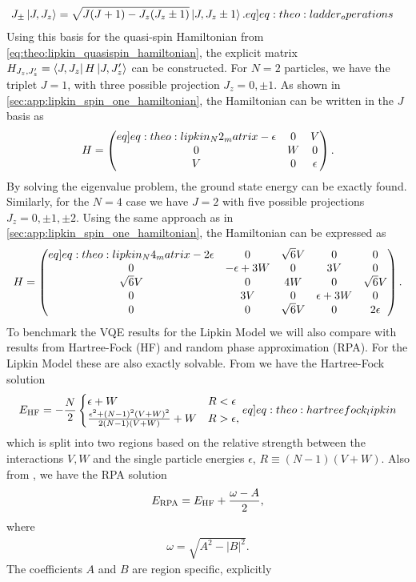 \begin{align}
    J_\pm \ket{J,J_z} &= \sqrt{J(J+1)-J_z (J_z \pm 1)} \ket{J,J_z \pm 1}. \label[eq]{eq:theo:ladder_operations}
\end{align}
Using this basis for the quasi-spin Hamiltonian from \cref{eq:theo:lipkin_quasispin_hamiltonian}, the explicit matrix $H_{J_z,J'_z} = \bra{J,J_z} H \ket{J,J_z'}$ can be constructed. For $N=2$ particles, we have the triplet $J=1$, with three possible projection $J_z = 0, \pm 1$. As shown in \cref{sec:app:lipkin_spin_one_hamiltonian}, the Hamiltonian can be written in the $J$ basis as
\begin{align}
    H = \begin{pmatrix} \label[eq]{eq:theo:lipkin_N2_matrix}
        -\epsilon & 0 & V \\
        0 & W & 0 \\
        V & 0 & \epsilon
    \end{pmatrix}.
\end{align}
By solving the eigenvalue problem, the ground state energy can be exactly found. Similarly, for the $N=4$ case we have $J = 2$ with five possible projections $J_z = 0,\pm1,\pm2$. Using the same approach as in \cref{sec:app:lipkin_spin_one_hamiltonian}, the Hamiltonian can be expressed as  
\begin{align}
    H = \begin{pmatrix}\label[eq]{eq:theo:lipkin_N4_matrix}
        -2\epsilon & 0  & \sqrt{6}V &0 &0 \\
        0 & -\epsilon + 3W & 0 & 3V & 0 \\
        \sqrt{6}V & 0 & 4W & 0 & \sqrt{6}V \\
        0 & 3V & 0 & \epsilon + 3W & 0 \\
        0 & 0 & \sqrt{6}V & 0 & 2\epsilon
    \end{pmatrix}.
\end{align}
To benchmark the VQE results for the Lipkin Model we will also compare with results from Hartree-Fock (HF) and random phase approximation (RPA). For the Lipkin Model these are also exactly solvable. From \citep{coHartreeFockRandom2015} we have the Hartree-Fock solution
\begin{align}
    \EHF = -\frac{N}{2}\begin{cases}
        \epsilon + W & R < \epsilon \\
        \frac{\epsilon^2 + (N-1)^2 (V+W)^2 }{2(N-1)(V+W)} + W & R > \epsilon,
    \end{cases} \label[eq]{eq:theo:hartreefock_lipkin}
\end{align}
which is split into two regions based on the relative strength between the interactions $V,W$ and the single particle energies $\epsilon$, $R \equiv (N-1)(V+W)$. Also from \citep{coHartreeFockRandom2015}, we have the RPA solution
\begin{align}
    E_{\text{RPA}} = E_{\text{HF}} + \frac{\omega - A}{2},
\end{align}
where
\begin{align*}
    \omega = \sqrt{A^2 - |B|^2}.
\end{align*}
The coefficients $A$ and $B$ are region specific, explicitly

